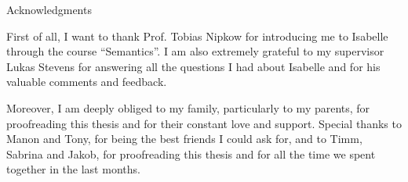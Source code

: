 \thispagestyle{empty}

\vspace*{20mm}

\begin{center}
{ Acknowledgments}
\end{center}

\vspace{10mm}

First of all, I want to thank Prof. Tobias Nipkow for introducing me to Isabelle through the course ``Semantics''.
I am also extremely grateful to my supervisor Lukas Stevens for answering all the questions I had about Isabelle and for his valuable comments and feedback.

Moreover, I am deeply obliged to my family, particularly to my parents, for proofreading this thesis and for their constant love and support.
Special thanks to Manon and Tony, for being the best friends I could ask for, and to Timm, Sabrina and Jakob, for proofreading this thesis and for all the time we spent together in the last months.





\cleardoublepage{}
